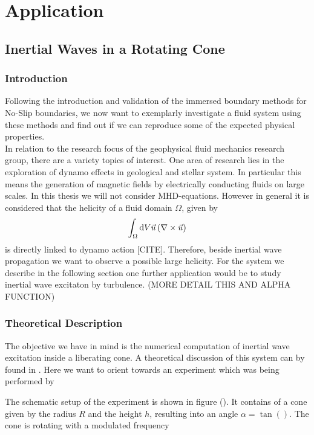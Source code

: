 \part{Application}
\chapter{Inertial Waves in a Rotating Cone}

\section{Introduction}

Following the introduction and validation of the immersed boundary methods for No-Slip boundaries,
we now want to exemplarly investigate a fluid system using these methods
and find out if we can reproduce some of the expected physical properties.\\
In relation to the research focus of the geophysical fluid mechanics research group, there are a variety
topics of interest.
One area of research lies in the exploration of dynamo effects in geological and stellar system.
In particular this means the generation of magnetic fields by electrically conducting fluids on large scales.
In this thesis we will not consider MHD-equations.
However in general it is considered that the helicity of a fluid domain $\Omega$, given by
\begin{align}
    \int_{\Omega}\mathop{}\!\mathrm{d} V  \vec{u} \left( \nabla \times \vec{u} \right)
\end{align}
is directly linked to dynamo action [CITE].
Therefore, beside inertial wave propagation we want to observe a possible large helicity.
For the system we describe in the following section one further application
would be to study inertial wave excitaton by turbulence. (MORE DETAIL THIS AND ALPHA FUNCTION)

\section{Theoretical Description}

The objective we have in mind is the numerical computation of inertial wave excitation inside a liberating cone.
A theoretical discussion of this system  can by found in \citep{GREENSPAN}.
Here we want to orient towards an experiment which was being performed by \citep{Beardsley1970}

The schematic setup of the experiment is shown in figure ().
It contains of a cone given by the radius $R$ and the height $h$, resulting into an angle $\alpha = \tan()$.
The cone is rotating with a modulated frequency

